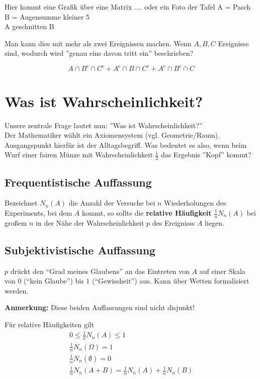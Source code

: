 Hier kommt eine Grafik über eine Matrix .... oder ein Foto der Tafel
A = Pasch\\
B = Augensumme kleiner 5\\
A geschnitten B

Man kann dies mit mehr als zwei Ereignissen machen.
Wenn $A,B,C$ Ereignisse sind, wodurch wird ''genau eins davon tritt ein'' beschrieben?

\begin{equation}
A \cap B^c \cap C^c + A^c \cap  B \cap C^c + A^c \cap B^c \cap C
\end{equation}

\section{Was ist Wahrscheinlichkeit?}

Unsere zentrale Frage lautet nun: ''Was ist Wahrscheinlichkeit?''\\
Der Mathematiker wählt ein Axiomensystem (vgl. Geometrie/Raum).
Ausgangspunkt hierfür ist der Alltagsbegriff.
Was bedeutet es also, wenn beim Wurf einer fairen Münze mit Wahrscheinlichkeit $\frac{1}{2}$ das Ergebnis ''Kopf'' kommt?\\

\subsection{Frequentistische Auffassung}

Bezeichnet $N_n(A)$ die Anzahl der Versuche bei $n$ Wiederholungen des Experiments, bei dem $A$ kommt, so sollte die \textbf{relative Häufigkeit} $\frac{1}{n} N_n(A)$ bei großem $n$ in der Nähe der Wahrscheinlichkeit $p$ des Ereignisss $A$ liegen.

\subsection{Subjektivistische Auffassung}

$p$ drückt den ``Grad meines Glaubens'' an das Eintreten von $A$ auf einer Skala von $0$ (``kein Glaube'') bis $1$ (``Gewissheit'') aus.
Kann über Wetten formalisiert werden.

\noindent \textbf{Anmerkung:} Diese beiden Auffassungen sind nicht disjunkt!

Für relative Häufigkeiten gilt
\begin{eqnarray*}
0 \leq \frac{1}{n} N_n(A) \leq 1 \\
\frac{1}{n} N_n(\Omega) = 1 \\
\frac{1}{n} N_n(\emptyset) = 0\\
\frac{1}{n} N_n(A+B) = \frac{1}{n} N_n(A) + \frac{1}{n} N_n(B)
\end{eqnarray*}

